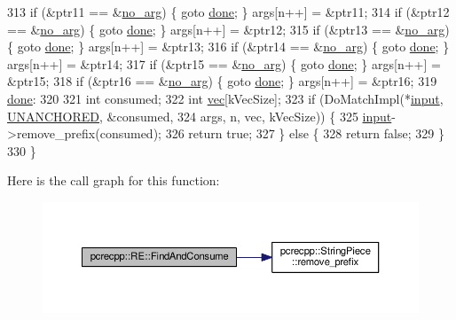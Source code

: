\begin{DoxyCode}
313   \textcolor{keywordflow}{if} (&ptr11 == &\hyperlink{classpcrecpp_1_1RE_a596c7c964ad0e41415540e12ee73d302}{no\_arg}) \{ \textcolor{keywordflow}{goto} \hyperlink{README_8txt_aab36b2734b1c834ca42fc771a40b98ef}{done}; \} args[n++] = &ptr11;
314   \textcolor{keywordflow}{if} (&ptr12 == &\hyperlink{classpcrecpp_1_1RE_a596c7c964ad0e41415540e12ee73d302}{no\_arg}) \{ \textcolor{keywordflow}{goto} \hyperlink{README_8txt_aab36b2734b1c834ca42fc771a40b98ef}{done}; \} args[n++] = &ptr12;
315   \textcolor{keywordflow}{if} (&ptr13 == &\hyperlink{classpcrecpp_1_1RE_a596c7c964ad0e41415540e12ee73d302}{no\_arg}) \{ \textcolor{keywordflow}{goto} \hyperlink{README_8txt_aab36b2734b1c834ca42fc771a40b98ef}{done}; \} args[n++] = &ptr13;
316   \textcolor{keywordflow}{if} (&ptr14 == &\hyperlink{classpcrecpp_1_1RE_a596c7c964ad0e41415540e12ee73d302}{no\_arg}) \{ \textcolor{keywordflow}{goto} \hyperlink{README_8txt_aab36b2734b1c834ca42fc771a40b98ef}{done}; \} args[n++] = &ptr14;
317   \textcolor{keywordflow}{if} (&ptr15 == &\hyperlink{classpcrecpp_1_1RE_a596c7c964ad0e41415540e12ee73d302}{no\_arg}) \{ \textcolor{keywordflow}{goto} \hyperlink{README_8txt_aab36b2734b1c834ca42fc771a40b98ef}{done}; \} args[n++] = &ptr15;
318   \textcolor{keywordflow}{if} (&ptr16 == &\hyperlink{classpcrecpp_1_1RE_a596c7c964ad0e41415540e12ee73d302}{no\_arg}) \{ \textcolor{keywordflow}{goto} \hyperlink{README_8txt_aab36b2734b1c834ca42fc771a40b98ef}{done}; \} args[n++] = &ptr16;
319  \hyperlink{README_8txt_aab36b2734b1c834ca42fc771a40b98ef}{done}:
320 
321   \textcolor{keywordtype}{int} consumed;
322   \textcolor{keywordtype}{int} \hyperlink{group__apr__file__io_ga026ee9293cfdb03a3944adbd192f1ead}{vec}[kVecSize];
323   \textcolor{keywordflow}{if} (DoMatchImpl(*\hyperlink{group__APACHE__CORE__DAEMON_gaf801cc3fb2a90cf95d512d76fb498c3f}{input}, \hyperlink{classpcrecpp_1_1RE_aafe8a162d00ec7a7d6d2ba67652735efa8511ace935198310276d68934194a16a}{UNANCHORED}, &consumed,
324                   args, n, vec, kVecSize)) \{
325     \hyperlink{group__APACHE__CORE__DAEMON_gaf801cc3fb2a90cf95d512d76fb498c3f}{input}->remove\_prefix(consumed);
326     \textcolor{keywordflow}{return} \textcolor{keyword}{true};
327   \} \textcolor{keywordflow}{else} \{
328     \textcolor{keywordflow}{return} \textcolor{keyword}{false};
329   \}
330 \}
\end{DoxyCode}


Here is the call graph for this function\+:
\nopagebreak
\begin{figure}[H]
\begin{center}
\leavevmode
\includegraphics[width=350pt]{classpcrecpp_1_1RE_abdbf777179c73439e7bac64181c4cf16_cgraph}
\end{center}
\end{figure}


